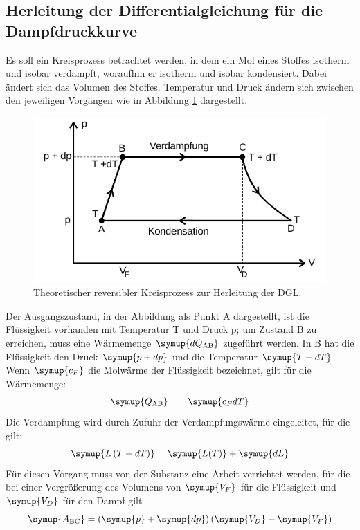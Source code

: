 \subsection{Herleitung der Differentialgleichung für die Dampfdruckkurve}
Es soll ein Kreisprozess betrachtet werden, in dem ein Mol eines Stoffes isotherm und isobar verdampft, 
woraufhin er isotherm und isobar kondensiert. Dabei ändert sich das Volumen des Stoffes. Temperatur
und Druck ändern sich zwischen den jeweiligen Vorgängen wie in Abbildung \ref{fig:kreis} dargestellt.
\begin{figure}
    \centering
    \includegraphics[width=\textwidth]{kreisprozess.png}
    \caption{Theoretischer reversibler Kreisprozess zur Herleitung der DGL.}
    \label{fig:kreis}
\end{figure}
Der Ausgangszustand, in der Abbildung als Punkt A dargestellt, ist die Flüssigkeit vorhanden mit 
Temperatur T und Druck p; um Zustand B zu erreichen, muss eine Wärmemenge $\symup{dQ_\text{AB}}$
zugeführt werden. In B hat die Flüssigkeit den Druck $\symup{p + dp}$ und die Temperatur $\symup{T + dT}$.
Wenn $\symup{c_F}$ die Molwärme der Flüssigkeit bezeichnet, gilt für die Wärmemenge:
\begin{equation}
\symup{Q_\text{AB}} =  = \symup{c_F dT}
\end{equation}
Die Verdampfung wird durch Zufuhr der Verdampfungswärme eingeleitet, für die gilt:
\begin{equation}
\symup{L \left( T + dT \right)} = \symup{L(T)} + \symup{dL}
\end{equation}
Für diesen Vorgang muss von der Substanz eine Arbeit verrichtet werden, für die bei einer Vergrößerung
des Volumens von $\symup{V_F}$ für die Flüssigkeit und $\symup{V_D}$ für den Dampf gilt
\begin{equation}
\symup{A_\text{BC}} = \left( \symup{p} + \symup{dp} \right) \left( \symup{V_D} - \symup{V_F} \right)
\end{equation}
